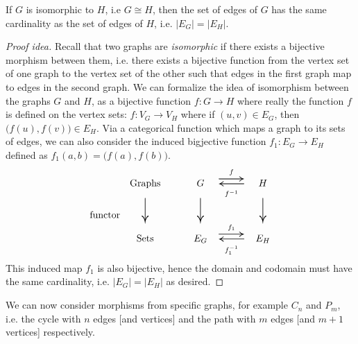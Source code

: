 \documentclass{article}
\begin{document}


  \begin{theorem}
  If $G$ is isomorphic to $H$, i.e $G \cong H$, then the set of edges of $G$ has the same cardinality as the set of edges of $H$, i.e. $|E_G|=|E_H|$.
  \end{theorem}
  \begin{proof}[Proof idea]
  Recall that two graphs are \textit{isomorphic} if there exists a bijective morphism between them, i.e. there exists a bijective function from the vertex set of one graph to the vertex set of the other such that edges in the first graph map to edges in the second graph.  We can formalize the idea of isomorphism between the graphs $G$ and $H$, as a bijective function $f \colon G \to H$ where really the function $f$ is defined on the vertex sets: $f\colon V_G \to V_H$ where if $(u,v) \in E_G$, then $\big(f(u),f(v)\big) \in E_H$.  Via a categorical function which maps a graph to its sets of edges, we can also consider the induced bigjective function $f_1 \colon E_G \to E_H$ defined as $f_1(a,b) = \big( f(a) , f(b) \big)$.
  \[\begin{array}{rccccc}
      &\text{Graphs}&\hspace*{5mm} &G & \overset{f}{\underset{f^{-1}}{\scalebox{3}[1.5]{\ensuremath{\rightleftarrows}}}}& H \\
     \text{functor}&\scalebox{1.5}[3]{\ensuremath{\downarrow}} &&\scalebox{1.5}[3]{\ensuremath{\downarrow}} && \scalebox{1.5}[3]{\ensuremath{\downarrow}}\\
      &\text{Sets} &&E_G & \overset{f_1}{\underset{f_1^{-1}}{\scalebox{3}[1.5]{\ensuremath{\rightleftarrows}}}}& E_H \\
  \end{array}\]
  This induced map $f_1$ is also bijective, hence the domain and codomain must have the same cardinality, i.e. $|E_G| = |E_H|$ as desired.
  \end{proof}


We can now consider morphisms from specific graphs, for example $C_n$ and $P_m$, i.e. the cycle with $n$ edges [and vertices] and the path with $m$ edges [and $m+1$ vertices] respectively.  
\end{document}
